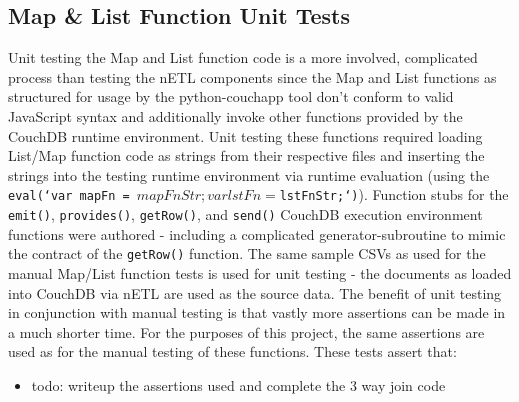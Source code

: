\newpage



\subsection{Map \& List Function Unit Tests}
Unit testing the Map and List function code is a more involved, complicated process than testing the nETL components since the Map and List functions as structured for usage by the python-couchapp tool don't conform to valid JavaScript syntax and additionally invoke other functions provided by the CouchDB runtime environment. Unit testing these functions required loading List/Map function code as strings from their respective files and inserting the strings into the testing runtime environment via runtime evaluation (using the \texttt{eval(`var mapFn = ${mapFnStr}; var lstFn = ${lstFnStr};`)}). Function stubs for the \texttt{emit()}, \texttt{provides()}, \texttt{getRow()}, and \texttt{send()} CouchDB execution environment functions were authored - including a complicated generator-subroutine to mimic the contract of the \texttt{getRow()} function. The same sample CSVs as used for the manual Map/List function tests is used for unit testing - the documents as loaded into CouchDB via nETL are used as the source data. The benefit of unit testing in conjunction with manual testing is that vastly more assertions can be made in a much shorter time. For the purposes of this project, the same assertions are used as for the manual testing of these functions. These tests assert that:

\begin{itemize}
  \item todo: writeup the assertions used and complete the 3 way join code
\end{itemize}